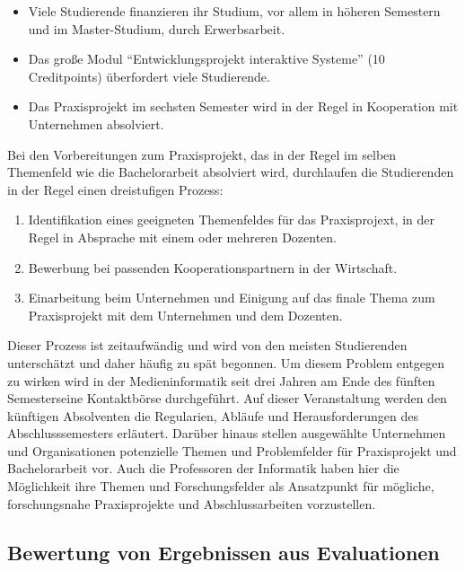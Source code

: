 \begin{itemize}
\tightlist
\item
  Viele Studierende finanzieren ihr Studium, vor allem in höheren
  Semestern und im Master-Studium, durch Erwerbsarbeit.
\item
  Das große Modul ``Entwicklungsprojekt interaktive Systeme'' (10
  Creditpoints) überfordert viele Studierende.
\item
  Das Praxisprojekt im sechsten Semester wird in der Regel in
  Kooperation mit Unternehmen absolviert.
\end{itemize}

Bei den Vorbereitungen zum Praxisprojekt, das in der Regel im selben
Themenfeld wie die Bachelorarbeit absolviert wird, durchlaufen die
Studierenden in der Regel einen dreistufigen Prozess:

\begin{enumerate}
\def\labelenumi{\arabic{enumi}.}
\tightlist
\item
  Identifikation eines geeigneten Themenfeldes für das Praxisprojext, in
  der Regel in Absprache mit einem oder mehreren Dozenten.
\item
  Bewerbung bei passenden Kooperationspartnern in der Wirtschaft.
\item
  Einarbeitung beim Unternehmen und Einigung auf das finale Thema zum
  Praxisprojekt mit dem Unternehmen und dem Dozenten.
\end{enumerate}

Dieser Prozess ist zeitaufwändig und wird von den meisten Studierenden
unterschätzt und daher häufig zu spät begonnen. Um diesem Problem
entgegen zu wirken wird in der Medieninformatik seit drei Jahren am Ende
des fünften Semesterseine Kontaktbörse durchgeführt. Auf dieser
Veranstaltung werden den künftigen Absolventen die Regularien, Abläufe
und Herausforderungen des Abschlusssemesters erläutert. Darüber hinaus
stellen ausgewählte Unternehmen und Organisationen potenzielle Themen
und Problemfelder für Praxisprojekt und Bachelorarbeit vor. Auch die
Professoren der Informatik haben hier die Möglichkeit ihre Themen und
Forschungsfelder als Ansatzpunkt für mögliche, forschungsnahe
Praxisprojekte und Abschlussarbeiten vorzustellen.

\subsection{Bewertung von Ergebnissen aus
Evaluationen}\label{bewertung-von-ergebnissen-aus-evaluationen}

